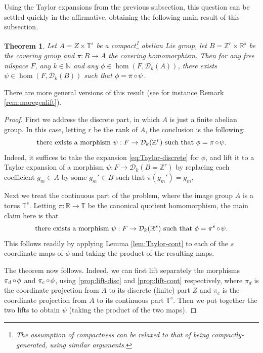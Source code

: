 \documentclass[a4paper,12pt,reqno]{amsart}
\newtheorem{theorem}{Theorem}[section]
\theoremstyle{definition}
\def\to{\rightarrow}
\newcommand{\mc}{\mathcal}
\newcommand{\mb}{\mathbb}
\DeclareMathOperator{\co}{\circ\hspace{-0.02 cm}}
\begin{document}
Using the Taylor expansions from the previous subsection, this question can be settled quickly in the affirmative, obtaining the following main result of this subsection.

\begin{theorem}\label{thm:lift-mor-cfr-ab-gr}
Let $A=Z\times \mb{T}^s$ be a compact\footnote{The assumption of compactness can be relaxed to that of being compactly-generated, using similar arguments.} abelian Lie group, let $B=\mb{Z}^r\times \mb{R}^s$ be the covering group and $\pi:B\to A$ the covering homomorphism. Then for any free nilspace $F$, any $k\in \mb{N}$ and any $\phi\in \hom(F,\mc{D}_k(A))$, there exists $\psi\in\hom(F,\mc{D}_k(B))$ such that $\phi = \pi\co \psi$. 
\end{theorem}
\noindent There are more general versions of this result (see for instance Remark \ref{rem:moregenlift}). 
\begin{proof}
First we address the discrete part, in which $A$ is just a finite abelian group. In this case, letting $r$ be the rank of $A$, the conclusion is the following:
\begin{equation}\label{prop:lift-disc}
 \textrm{there exists a morphism $\psi:F\to \mc{D}_k(\mb{Z}^r)$ such that $\phi=\pi\co\psi$.}   
\end{equation}
Indeed, it suffices to take the expansion \eqref{eq:Taylor-discrete} for $\phi$, and lift it to a Taylor expansion of a morphism $\psi:F\to \mc{D}_k(B=\mb{Z}^r)$ by replacing each coefficient $g_m\in A$ by some $g_m'\in B$ such that $\pi(g_m')=g_m$.

Next we treat the continuous part of the problem, where the image group $A$ is a torus $\mb{T}^s$. Letting $\pi:\mb{R}\to\mb{T}$ be the canonical quotient homomorphism, the main claim here is that
\begin{equation}\label{prop:lift-cont}
\textrm{there exists a morphism $\psi:F\to \mc{D}_k(\mb{R}^s)$ such that $\phi=\pi^s\co\psi$.}
\end{equation}
This follows readily by applying Lemma \ref{lem:Taylor-cont} to each of the $s$ coordinate maps of $\phi$ and taking the product of the resulting maps.

The theorem now follows. Indeed,  we can first lift separately the morphisms $\pi_d\co\phi$ and $\pi_c\co\phi$, using \eqref{prop:lift-disc} and \eqref{prop:lift-cont} respectively, where $\pi_d$ is the coordinate projection from $A$ to its discrete (finite) part $Z$ and $\pi_c$ is the coordinate projection from $A$ to its continuous part $\mb{T}^s$. Then we put together the two lifts to obtain $\psi$ (taking the product of the two maps).
\end{proof}
\end{document}
